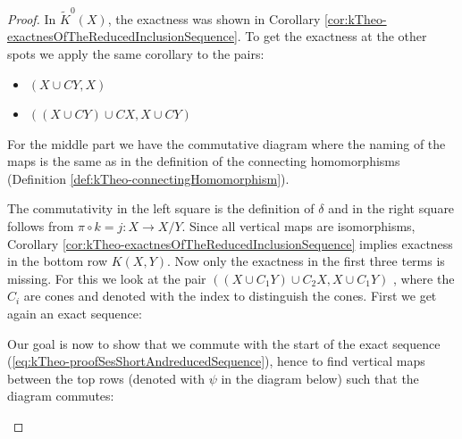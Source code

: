 \begin{proof}
	In $\tilde{K}^0(X)$, the exactness was shown in Corollary \ref{cor:kTheo-exactnesOfTheReducedInclusionSequence}.
	To get the exactness at the other spots we apply the same corollary to the pairs:
	\begin{itemize}
		\item $(X\cup CY,X)$
		\item $((X\cup CY)\cup CX,X\cup CY)$
	\end{itemize}
	For the middle part we have the commutative diagram where the naming of the maps is the same as in the definition of the connecting homomorphisms (Definition \ref{def:kTheo-connectingHomomorphism}).
	\begin{center}
		    \end{center}
	The commutativity in the left square is the definition of $\delta$ and in the right square follows from $\pi\circ k=j:X\to X\big/Y$. Since all vertical maps are isomorphisms, Corollary \ref{cor:kTheo-exactnesOfTheReducedInclusionSequence} implies exactness in the bottom row $K(X,Y)$. Now only the exactness in the first three terms is missing. For this we look at the pair $((X\cup C_1Y)\cup C_2X,X\cup C_1Y)$ , where the  $C_i$ are cones and denoted with the index to distinguish the cones. First we get again an exact sequence:
	\begin{center}
	\end{center}
	Our goal is now to show that we commute with the start of the exact sequence (\ref{eq:kTheo-proofSesShortAndreducedSequence}), hence to find vertical maps between the top rows (denoted with ${\psi}$ in the diagram below) such that the diagram commutes:
	\begin{fdiagram} \label{diag:kTheo-proofConnectingHomo}
\end{fdiagram}
\end{proof}
